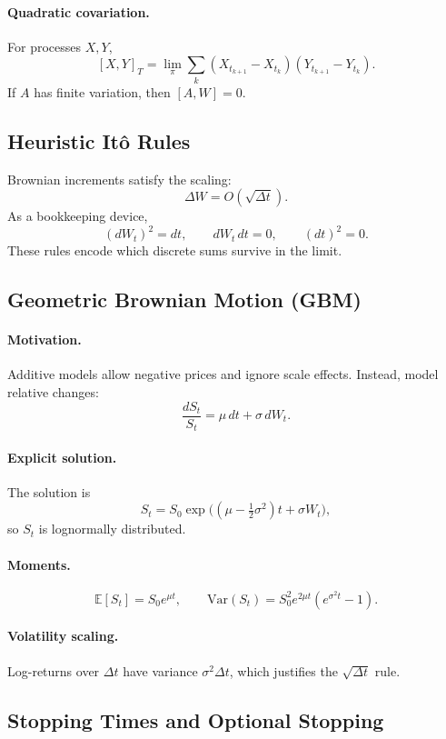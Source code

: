 \documentclass[11pt]{article}
\newcommand{\E}{\mathbb{E}}
\newcommand{\Var}{\mathrm{Var}}
\newcommand{\1}{\mathbf{1}}
\theoremstyle{plain}
\theoremstyle{definition}
\theoremstyle{remark}
\begin{document}
\paragraph{Quadratic covariation.}
For processes $X,Y$,
\[
[X,Y]_T=\lim_{\pi}\sum_k (X_{t_{k+1}}-X_{t_k})(Y_{t_{k+1}}-Y_{t_k}).
\]
If $A$ has finite variation, then $[A,W]=0$.

\subsection{Heuristic It\^o Rules}

Brownian increments satisfy the scaling:
\[
\Delta W = O(\sqrt{\Delta t}).
\]
As a bookkeeping device,
\[
(dW_t)^2=dt,
\qquad
dW_t\,dt=0,
\qquad
(dt)^2=0.
\]
These rules encode which discrete sums survive in the limit.

\subsection{Geometric Brownian Motion (GBM)}

\paragraph{Motivation.}
Additive models allow negative prices and ignore scale effects.
Instead, model relative changes:
\[
\frac{dS_t}{S_t}=\mu\,dt+\sigma\,dW_t.
\]

\paragraph{Explicit solution.}
The solution is
\[
S_t=S_0\exp\!\Big(
(\mu-\tfrac12\sigma^2)t+\sigma W_t
\Big),
\]
so $S_t$ is lognormally distributed.

\paragraph{Moments.}
\[
\E[S_t]=S_0 e^{\mu t},
\qquad
\Var(S_t)=S_0^2 e^{2\mu t}(e^{\sigma^2 t}-1).
\]

\paragraph{Volatility scaling.}
Log-returns over $\Delta t$ have variance $\sigma^2\Delta t$,
which justifies the $\sqrt{\Delta t}$ rule.

\subsection{Stopping Times and Optional Stopping}
\end{document}
